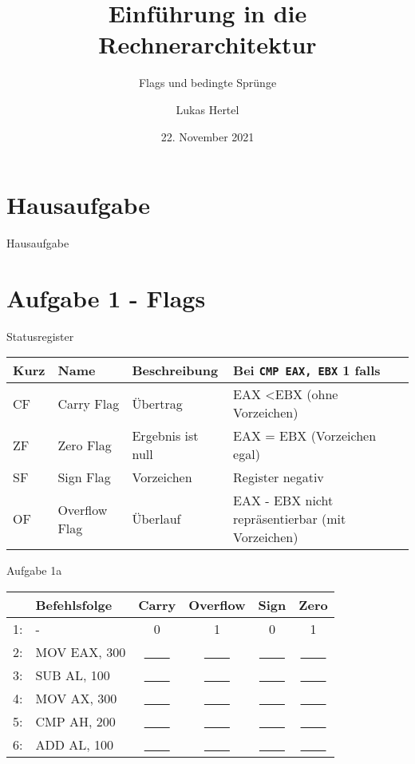 \documentclass[
  german,            %
  aspectratio=169,    %
  sectionpage=false,   %
]{tumbeamer}
\title{Einführung in die Rechnerarchitektur}
\subtitle{Flags und bedingte Sprünge}
\author{Lukas Hertel}
\institute{\theChairName\\\theDepartmentName\\\theUniversityName}
\date[22.11.2021]{22. November 2021}
\begin{document}
\maketitle

\section{Hausaufgabe}
\begin{frame}{Hausaufgabe}
\end{frame}

\section{Aufgabe 1 - Flags}
\begin{frame}{Statusregister}
\begin{table}[]
	\begin{tabular}{llll}
		\hline
		\textbf{Kurz} & \textbf{Name} & \textbf{Beschreibung} & \textbf{Bei \texttt{CMP EAX, EBX} 1 falls}                                \\ \hline
		CF                 & Carry Flag    & Übertrag              & EAX \textless \space EBX (ohne Vorzeichen)              \\
		ZF                 & Zero Flag     & Ergebnis ist null     & EAX = EBX (Vorzeichen egal)                      \\
		SF                 & Sign Flag     & Vorzeichen            & Register negativ                                 \\
		OF                 & Overflow Flag & Überlauf              & EAX - EBX nicht repräsentierbar (mit Vorzeichen) \\ \hline
	\end{tabular}
\end{table}
\end{frame}
\begin{frame}{Aufgabe 1a}
			\begin{center}
		\begin{tabular}{r l c c c c}
			& Befehlsfolge & Carry & Overflow & Sign & Zero\\ \hline
			1: & - & 0 & 1 & 0 & 1\\
			2: & MOV EAX, 300 & \underline{~~~~} & \underline{~~~~} & \underline{~~~~} & \underline{~~~~}\\
			3: & SUB AL, 100 & \underline{~~~~} & \underline{~~~~} & \underline{~~~~} & \underline{~~~~}\\
			4: & MOV AX, 300 & \underline{~~~~} & \underline{~~~~} & \underline{~~~~} & \underline{~~~~}\\
			5: & CMP AH, 200 & \underline{~~~~} & \underline{~~~~} & \underline{~~~~} & \underline{~~~~}\\
			6: & ADD AL, 100 & \underline{~~~~} & \underline{~~~~} & \underline{~~~~} & \underline{~~~~}
		\end{tabular}
	\end{center}
\end{frame}
\end{document}
